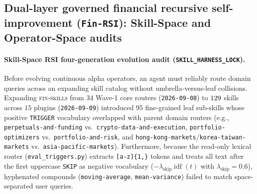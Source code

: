 \subsection{Dual-layer governed financial recursive self-improvement (\texttt{Fin-RSI}): Skill-Space and Operator-Space audits}
\label{app:fin_rsi}
\paragraph{Skill-Space RSI four-generation evolution audit (\texttt{SKILL\_HARNESS\_LOCK}).}
Before evolving continuous alpha operators, an agent must reliably route domain queries across an expanding skill catalog without umbrella-versus-leaf collisions. Expanding \textsc{fin-skills} from $34$ Wave-1 core routers (\texttt{2026-09-08}) to $129{}$ skills across $15$ plugins (\texttt{2026-09-09}) introduced $95$ fine-grained leaf sub-skills whose positive \texttt{TRIGGER} vocabulary overlapped with parent domain routers (e.g., \texttt{perpetuals-and-funding} vs.\ \texttt{crypto-data-and-execution}, \texttt{portfolio-optimizers} vs.\ \texttt{portfolio-and-risk}, and \texttt{hong-kong-\allowbreak markets}/\allowbreak\texttt{korea-taiwan-\allowbreak markets} vs.\ \texttt{asia-pacific-markets}). Furthermore, because the read-only lexical router (\texttt{eval\_triggers.py}) extracts \texttt{[a-z]\allowbreak[a-z0-9\_.\textbackslash -]\{1,\}} tokens and treats all text after the first uppercase \texttt{SKIP} as negative vocabulary ($-\lambda_{\text{skip}}\operatorname{idf}(t)$ with $\lambda_{\text{skip}}=0.6$), hyphenated compounds (\texttt{moving-average}, \texttt{mean-variance}) failed to match space-separated user queries.


